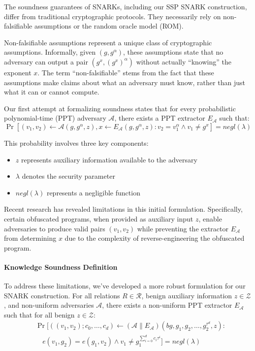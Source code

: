 \documentclass[12pt]{tufte-book}
\begin{document}
The soundness guarantees of SNARKs, including our SSP SNARK construction, differ from traditional cryptographic protocols. They necessarily rely on non-falsifiable assumptions or the random oracle model (ROM).

Non-falsifiable assumptions represent a unique class of cryptographic assumptions. Informally, given $(g, g^\alpha)$, these assumptions state that no adversary can output a pair $(g^x, (g^x)^\alpha)$ without actually ``knowing'' the exponent $x$. The term ``non-falsifiable'' stems from the fact that these assumptions make claims about what an adversary must know, rather than just what it can or cannot compute.

Our first attempt at formalizing soundness states that for every probabilistic polynomial-time (PPT) adversary $\mathcal{A}$, there exists a PPT extractor $E_\mathcal{A}$ such that:
\[ \Pr[(v_1, v_2) \gets \mathcal{A}(g, g^\alpha, z), x \gets E_\mathcal{A}(g, g^\alpha, z) : v_2 = v_1^\alpha \land v_1 \neq g^x] = negl(\lambda) \]

This probability involves three key components:
\begin{itemize}
    \item $z$ represents auxiliary information available to the adversary
    \item $\lambda$ denotes the security parameter
    \item $negl(\lambda)$ represents a negligible function
\end{itemize}

Recent research has revealed limitations in this initial formulation. Specifically, certain obfuscated programs, when provided as auxiliary input $z$, enable adversaries to produce valid pairs $(v_1, v_2)$ while preventing the extractor $E_\mathcal{A}$ from determining $x$ due to the complexity of reverse-engineering the obfuscated program.

\paragraph{Knowledge Soundness Definition}

To address these limitations, we've developed a more robust formulation for our SNARK construction. For all relations $R \in \mathcal{R}$, benign auxiliary information $z \in \mathcal{Z}$, and non-uniform adversaries $\mathcal{A}$, there exists a non-uniform PPT extractor $E_\mathcal{A}$ such that for all benign $z \in \mathcal{Z}$:
\[ \begin{aligned}
&\Pr[((v_1, v_2); c_0, \dots, c_d) \gets (\mathcal{A} \| E_\mathcal{A})(bg, g_1, g_2, \dots, g_2^{\tau^d}, z) : \\
&\quad e(v_1, g_2) = e(g_1, v_2) \land v_1 \neq g_1^{\sum_{i=0}^d c_i \tau^i}] = negl(\lambda)
\end{aligned} \]
\end{document}

